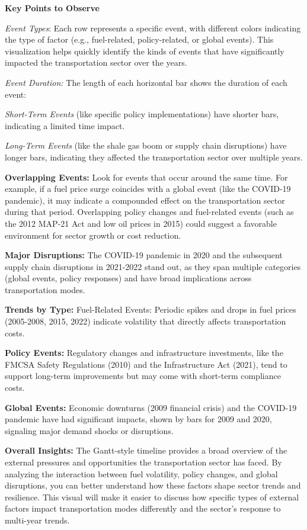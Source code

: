 \documentclass[
  letterpaper,
  DIV=11,
  numbers=noendperiod]{scrreprt}
\begin{document}
\textbf{Key Points to Observe}

\emph{Event Types}: Each row represents a specific event, with different
colors indicating the type of factor (e.g., fuel-related,
policy-related, or global events). This visualization helps quickly
identify the kinds of events that have significantly impacted the
transportation sector over the years.

\emph{Event Duration:} The length of each horizontal bar shows the
duration of each event:

\emph{Short-Term Events} (like specific policy implementations) have
shorter bars, indicating a limited time impact.

\emph{Long-Term Events} (like the shale gas boom or supply chain
disruptions) have longer bars, indicating they affected the
transportation sector over multiple years.

\textbf{Overlapping Events:} Look for events that occur around the same
time. For example, if a fuel price surge coincides with a global event
(like the COVID-19 pandemic), it may indicate a compounded effect on the
transportation sector during that period. Overlapping policy changes and
fuel-related events (such as the 2012 MAP-21 Act and low oil prices in
2015) could suggest a favorable environment for sector growth or cost
reduction.

\textbf{Major Disruptions:} The COVID-19 pandemic in 2020 and the
subsequent supply chain disruptions in 2021-2022 stand out, as they span
multiple categories (global events, policy responses) and have broad
implications across transportation modes.

\textbf{Trends by Type:} Fuel-Related Events: Periodic spikes and drops
in fuel prices (2005-2008, 2015, 2022) indicate volatility that directly
affects transportation costs.

\textbf{Policy Events:} Regulatory changes and infrastructure
investments, like the FMCSA Safety Regulations (2010) and the
Infrastructure Act (2021), tend to support long-term improvements but
may come with short-term compliance costs.

\textbf{Global Events:} Economic downturns (2009 financial crisis) and
the COVID-19 pandemic have had significant impacts, shown by bars for
2009 and 2020, signaling major demand shocks or disruptions.

\textbf{Overall Insights:} The Gantt-style timeline provides a broad
overview of the external pressures and opportunities the transportation
sector has faced. By analyzing the interaction between fuel volatility,
policy changes, and global disruptions, you can better understand how
these factors shape sector trends and resilience. This visual will make
it easier to discuss how specific types of external factors impact
transportation modes differently and the sector's response to multi-year
trends.
\end{document}
